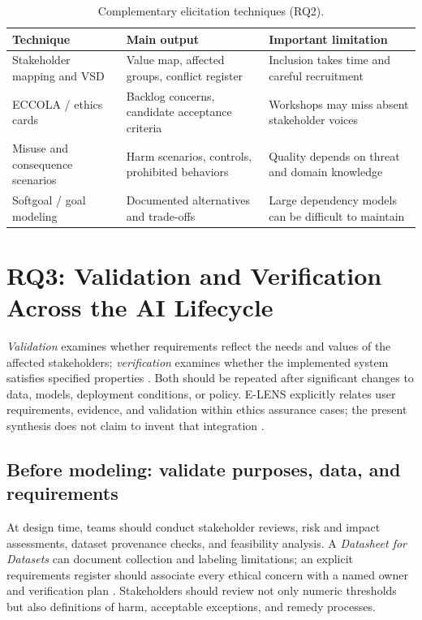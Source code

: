 \documentclass[11pt,a4paper]{article}
\begin{document}
\begin{table}[htbp]
\centering\small
\caption{Complementary elicitation techniques (RQ2).}\label{tab:elicitation}
\begin{tabularx}{\linewidth}{p{2.8cm}X X}
\toprule
\textbf{Technique} & \textbf{Main output} & \textbf{Important limitation}\\\midrule
Stakeholder mapping and VSD & Value map, affected groups, conflict register & Inclusion takes time and careful recruitment\\
ECCOLA / ethics cards & Backlog concerns, candidate acceptance criteria & Workshops may miss absent stakeholder voices\\
Misuse and consequence scenarios & Harm scenarios, controls, prohibited behaviors & Quality depends on threat and domain knowledge\\
Softgoal / goal modeling & Documented alternatives and trade-offs & Large dependency models can be difficult to maintain\\
\bottomrule
\end{tabularx}
\end{table}

\section{RQ3: Validation and Verification Across the AI Lifecycle}
\emph{Validation} examines whether requirements reflect the needs and values of the affected stakeholders; \emph{verification} examines whether the implemented system satisfies specified properties \cite{boehm1984}. Both should be repeated after significant changes to data, models, deployment conditions, or policy. E-LENS explicitly relates user requirements, evidence, and validation within ethics assurance cases; the present synthesis does not claim to invent that integration \cite{zhou2025}.

\subsection{Before modeling: validate purposes, data, and requirements}
At design time, teams should conduct stakeholder reviews, risk and impact assessments, dataset provenance checks, and feasibility analysis. A \emph{Datasheet for Datasets} can document collection and labeling limitations; an explicit requirements register should associate every ethical concern with a named owner and verification plan \cite{gebru2021,reisman2018}. Stakeholders should review not only numeric thresholds but also definitions of harm, acceptable exceptions, and remedy processes.
\end{document}
